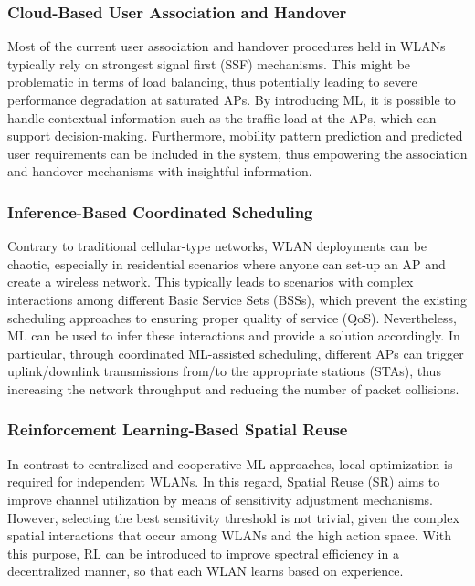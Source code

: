 \documentclass[journal]{IEEEtran}
\begin{document}
\subsubsection{Cloud-Based User Association and Handover}
Most of the current user association and handover procedures held in WLANs typically rely on strongest signal first (SSF) mechanisms. This might be problematic in terms of load balancing, thus potentially leading to severe performance degradation at saturated APs. By introducing ML, it is possible to handle contextual information such as the traffic load at the APs, which can support decision-making. Furthermore, mobility pattern prediction and predicted user requirements can be included in the system, thus empowering the association and handover mechanisms with insightful information. %


\subsubsection{Inference-Based Coordinated Scheduling}

Contrary to traditional cellular-type networks, WLAN deployments can be chaotic, especially in residential scenarios where anyone can set-up an AP and create a wireless network. This typically leads to scenarios with complex interactions among different Basic Service Sets (BSSs), which prevent the existing scheduling approaches to ensuring proper quality of service (QoS). Nevertheless, ML can be used to infer these interactions and provide a solution accordingly. In particular, through coordinated ML-assisted scheduling, different APs can trigger uplink/downlink transmissions from/to the appropriate stations (STAs), thus increasing the network throughput and reducing the number of packet collisions.

\subsubsection{Reinforcement Learning-Based Spatial Reuse} 
In contrast to centralized and cooperative ML approaches, local optimization is required for independent WLANs. In this regard, Spatial Reuse (SR) aims to improve channel utilization by means of sensitivity adjustment mechanisms. However, selecting the best sensitivity threshold is not trivial, given the complex spatial interactions that occur among WLANs and the high action space. With this purpose, RL can be introduced to improve spectral efficiency in a decentralized manner, so that each WLAN learns based on experience.
\end{document}
